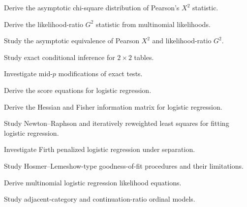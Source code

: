 \begin{exercise}[4]
Derive the asymptotic chi-square distribution of Pearson's \(X^2\)
statistic.
\end{exercise}

\begin{exercise}[4]
Derive the likelihood-ratio \(G^2\) statistic from multinomial
likelihoods.
\end{exercise}

\begin{exercise}[4]
Study the asymptotic equivalence of Pearson \(X^2\) and likelihood-ratio
\(G^2\).
\end{exercise}

\begin{exercise}[4]
Study exact conditional inference for \(2\times2\) tables.
\end{exercise}

\begin{exercise}[4]
Investigate mid-\(p\) modifications of exact tests.
\end{exercise}

\begin{exercise}[4]
Derive the score equations for logistic regression.
\end{exercise}

\begin{exercise}[4]
Derive the Hessian and Fisher information matrix for logistic regression.
\end{exercise}

\begin{exercise}[4]
Study Newton--Raphson and iteratively reweighted least squares for fitting
logistic regression.
\end{exercise}

\begin{exercise}[4]
Investigate Firth penalized logistic regression under separation.
\end{exercise}

\begin{exercise}[4]
Study Hosmer--Lemeshow-type goodness-of-fit procedures and their
limitations.
\end{exercise}

\begin{exercise}[4]
Derive multinomial logistic regression likelihood equations.
\end{exercise}

\begin{exercise}[4]
Study adjacent-category and continuation-ratio ordinal models.
\end{exercise}

